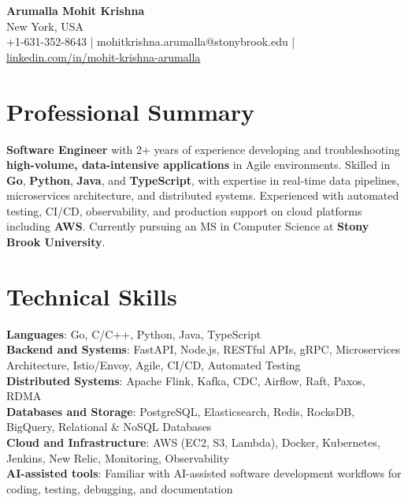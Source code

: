 \documentclass[letterpaper,11pt]{article}
\begin{document}
\begin{center}
  {\Large \textbf{Arumalla Mohit Krishna}} \\
  New York, USA \\
  +1-631-352-8643 \enspace | \enspace mohitkrishna.arumalla@stonybrook.edu \enspace | \enspace \href{https://www.linkedin.com/in/mohit-krishna-arumalla}{linkedin.com/in/mohit-krishna-arumalla}
\end{center}

\section{Professional Summary}
  \begin{itemize}[leftmargin=0.15in, label={}]
    \small{\item{
     \textbf{Software Engineer} with 2+ years of experience developing and troubleshooting \textbf{high-volume, data-intensive applications} in Agile environments. Skilled in \textbf{Go}, \textbf{Python}, \textbf{Java}, and \textbf{TypeScript}, with expertise in real-time data pipelines, microservices architecture, and distributed systems. Experienced with automated testing, CI/CD, observability, and production support on cloud platforms including \textbf{AWS}. Currently pursuing an MS in Computer Science at \textbf{Stony Brook University}.
    }}
  \end{itemize}
\vspace{-16pt}

\section{Technical Skills}
 \begin{itemize}[leftmargin=0.15in, label={}]
    \small{\item{
     \textbf{Languages}: Go, C/C++, Python, Java, TypeScript \\
     \textbf{Backend and Systems}: FastAPI, Node.js, RESTful APIs, gRPC, Microservices Architecture, Istio/Envoy, Agile, CI/CD, Automated Testing \\
     \textbf{Distributed Systems}: Apache Flink, Kafka, CDC, Airflow, Raft, Paxos, RDMA \\
     \textbf{Databases and Storage}: PostgreSQL, Elasticsearch, Redis, RocksDB, BigQuery, Relational \& NoSQL Databases \\
     \textbf{Cloud and Infrastructure}: AWS (EC2, S3, Lambda), Docker, Kubernetes, Jenkins, New Relic, Monitoring, Observability \\
     \textbf{AI-assisted tools}: Familiar with AI-assisted software development workflows for coding, testing, debugging, and documentation
    }}
 \end{itemize}
\vspace{-16pt}
\end{document}
